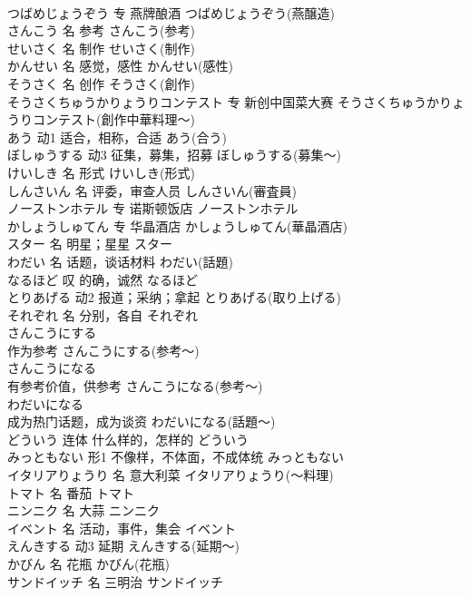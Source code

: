 \documentclass[8pt]{extreport}
\begin{document}
\begin{CJK}{UTF8}{min}
\\	つばめじょうぞう	专	燕牌酿酒	つばめじょうぞう(燕醸造)	
\\	さんこう	名	参考	さんこう(参考)	
\\	せいさく	名	制作	せいさく(制作)	
\\	かんせい	名	感觉，感性	かんせい(感性)	
\\	そうさく	名	创作	そうさく(創作)	
\\	そうさくちゅうかりょうりコンテスト	专	新创中国菜大赛	そうさくちゅうかりょうりコンテスト(創作中華料理～)	
\\	あう	动1	适合，相称，合适	あう(合う)	
\\	ぼしゅうする	动3	征集，募集，招募	ぼしゅうする(募集～)	
\\	けいしき	名	形式	けいしき(形式)	
\\	しんさいん	名	评委，审查人员	しんさいん(審査員)	
\\	ノーストンホテル	专	诺斯顿饭店	ノーストンホテル	
\\	かしょうしゅてん	专	华晶酒店	かしょうしゅてん(華晶酒店)	
\\	スター	名	明星；星星	スター	
\\	わだい	名	话题，谈话材料	わだい(話題)	
\\	なるほど	叹	的确，诚然	なるほど	
\\	とりあげる	动2	报道；采纳；拿起	とりあげる(取り上げる)	
\\	それぞれ	名	分别，各自	それぞれ	
\\	さんこうにする	
\\	作为参考	さんこうにする(参考～)	
\\	さんこうになる	
\\	有参考价值，供参考	さんこうになる(参考～)	
\\	わだいになる	
\\	成为热门话题，成为谈资	わだいになる(話題～)	
\\	どういう	连体	什么样的，怎样的	どういう	
\\	みっともない	形1	不像样，不体面，不成体统	みっともない	
\\	イタリアりょうり	名	意大利菜	イタリアりょうり(～料理)	
\\	トマト	名	番茄	トマト	
\\	ニンニク	名	大蒜	ニンニク	
\\	イベント	名	活动，事件，集会	イベント	
\\	えんきする	动3	延期	えんきする(延期～)	
\\	かびん	名	花瓶	かびん(花瓶)	
\\	サンドイッチ	名	三明治	サンドイッチ	

\end{CJK}
\end{document}
